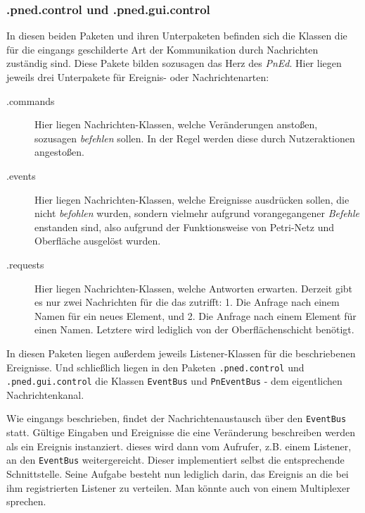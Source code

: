 \documentclass[11pt]{article}
\begin{document}
\subsubsection{.pned.control und .pned.gui.control}
\label{sec-1-2-6}

    In diesen beiden Paketen und ihren Unterpaketen befinden sich die
    Klassen die für die eingangs geschilderte Art der Kommunikation
    durch Nachrichten zuständig sind.  Diese Pakete bilden sozusagen
    das Herz des \emph{PnEd}.  Hier liegen jeweils drei Unterpakete für
    Ereignis- oder Nachrichtenarten:
    
\begin{description}
\item[.commands] Hier liegen Nachrichten-Klassen, welche
                   Veränderungen anstoßen, sozusagen \emph{befehlen}
                   sollen. In der Regel werden diese durch
                   Nutzeraktionen angestoßen.
\item[.events] Hier liegen Nachrichten-Klassen, welche Ereignisse
                 ausdrücken sollen, die nicht \emph{befohlen} wurden,
                 sondern vielmehr aufgrund vorangegangener \emph{Befehle}
                 enstanden sind, also aufgrund der Funktionsweise von
                 Petri-Netz und Oberfläche ausgelöst wurden.
\item[.requests] Hier liegen Nachrichten-Klassen, welche Antworten
                   erwarten. Derzeit gibt es nur zwei Nachrichten für
                   die das zutrifft: 1. Die Anfrage nach einem Namen
                   für ein neues Element, und 2. Die Anfrage nach
                   einem Element für einen Namen. Letztere wird
                   lediglich von der Oberflächenschicht benötigt.
\end{description}

    In diesen Paketen liegen außerdem jeweils Listener-Klassen für die
    beschriebenen Ereignisse. Und schließlich liegen in den Paketen
    \verb|.pned.control| und \verb|.pned.gui.control| die Klassen
    \verb|EventBus| und \verb|PnEventBus| - dem eigentlichen
    Nachrichtenkanal.

    Wie eingangs beschrieben, findet der Nachrichtenaustausch über den
    \verb|EventBus| statt.  Gültige Eingaben und Ereignisse die eine
    Veränderung beschreiben werden als ein Ereignis
    instanziert. dieses wird dann vom Aufrufer, z.B. einem Listener,
    an den \verb|EventBus| weitergereicht. Dieser implementiert selbst
    die entsprechende Schnittstelle. Seine Aufgabe besteht nun
    lediglich darin, das Ereignis an die bei ihm registrierten
    Listener zu verteilen. Man könnte auch von einem Multiplexer
    sprechen.
    
\end{document}
